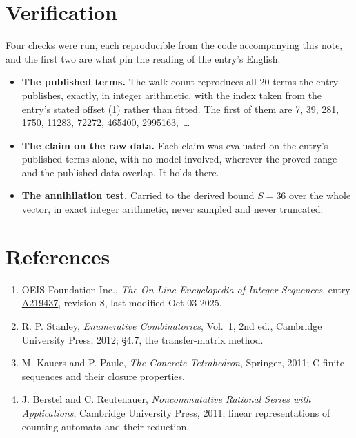 \documentclass[11pt]{article}
\theoremstyle{definition}
\begin{document}
\section{Verification}

Four checks were run, each reproducible from the code accompanying this note, and the first two are what pin the reading of the entry's English.

\begin{itemize}

\item {\bfseries The published terms.} The walk count reproduces all 20 terms the entry publishes, exactly, in integer arithmetic, with the index taken from the entry's stated offset (1) rather than fitted. The first of them are 7, 39, 281, 1750, 11283, 72272, 465400, 2995163,~\dots

\item {\bfseries The claim on the raw data.} Each claim was evaluated on the entry's published terms alone, with no model involved, wherever the proved range and the published data overlap. It holds there.

\item {\bfseries The annihilation test.} Carried to the derived bound $S = 36$ over the whole vector, in exact integer arithmetic, never sampled and never truncated.

\end{itemize}

\section{References}

\begin{enumerate}

\item OEIS Foundation Inc., \emph{The On-Line Encyclopedia of Integer Sequences}, entry \href{https://oeis.org/A219437}{A219437}, revision 8, last modified Oct 03 2025.

\item R. P. Stanley, \emph{Enumerative Combinatorics}, Vol.~1, 2nd ed., Cambridge University Press, 2012; \S4.7, the transfer-matrix method.

\item M. Kauers and P. Paule, \emph{The Concrete Tetrahedron}, Springer, 2011; C-finite sequences and their closure properties.

\item J. Berstel and C. Reutenauer, \emph{Noncommutative Rational Series with Applications}, Cambridge University Press, 2011; linear representations of counting automata and their reduction.

\end{enumerate}
\end{document}
